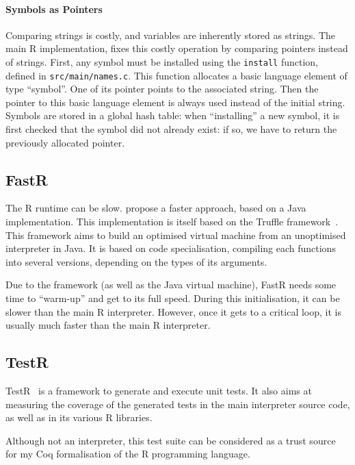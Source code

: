 \documentclass{article}
\newcommand\Coq{Coq}
\newcommand\R{R}
\begin{document}
\paragraph{Symbols as Pointers}
%
Comparing strings is costly,
and variables are inherently stored as strings.
The main \R{} implementation,
fixes this costly operation by comparing pointers
instead of strings.
First, any symbol must be installed using the \texttt{install}
function, defined in \texttt{src/main/names.c}.
This function allocates a basic language element
of type “symbol”.
One of its pointer points to the associated string.
Then the pointer to this basic language element
is always used instead of the initial string.
%
Symbols are stored in a global hash table:
when “installing” a new symbol, it is first checked
that the symbol did not already exist:
if so, we have to return the previously allocated pointer.


\subsection{FastR}
\label{sec:FastR}

The \R{} runtime can be slow.
\cite{kalibera2014fast} propose a faster approach,
based on a Java implementation.
This implementation is itself based on the Truffle
framework~\parencite{wimmer2012truffle}.
This framework aims to build an optimised virtual machine
from an unoptimised interpreter in Java.
It is based on code specialisation,
compiling each functions into several versions,
depending on the types of its arguments.

Due to the framework (as well as the Java virtual machine),
FastR needs some time to “warm-up” and get to its full speed.
During this initialisation, it can be slower than the main
\R{} interpreter.
However, once it gets to a critical loop,
it is usually much faster than the main \R{} interpreter.

\subsection{TestR}
\label{sec:TestR}

TestR~\parencite{maj2013testr, 2014testr} is a framework to generate and execute unit tests.
It also aims at measuring the coverage of the generated tests
in the main interpreter source code,
as well as in its various \R{} libraries.

Although not an interpreter,
this test suite can be considered as a trust source
for my \Coq{} formalisation of the \R{} programming language.
\end{document}
